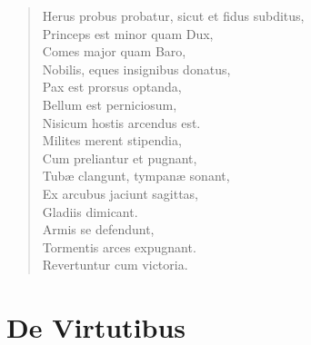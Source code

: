 \begin{verse}
  Herus probus probatur, sicut et fidus subditus,\\ 
  Princeps est minor quam Dux,\\
  Comes major quam Baro,\\
  Nobilis, eques insignibus donatus,\\
  Pax est prorsus optanda,\\
  Bellum est perniciosum,\\
  Nisicum hostis arcendus est.\\
  Milites merent stipendia,\\
  Cum preliantur et pugnant,\\
  Tubæ clangunt, tympanæ sonant,\\
  Ex arcubus jaciunt sagittas,\\
  Gladiis dimicant.\\
  Armis se defendunt,\\
  Tormentis arces expugnant.\\
  Revertuntur cum victoria.\\
\end{verse}



\chapter{De Virtutibus}


